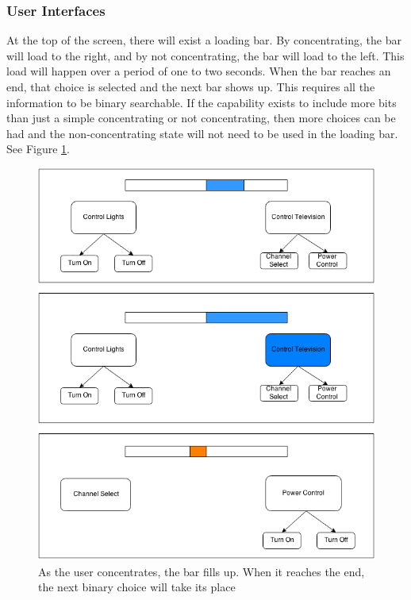 \documentclass{article}
\begin{document}
\subsubsection{User Interfaces}

At the top of the screen, there will exist a loading bar. By concentrating, the bar will load to the right, and by not concentrating, the bar will load to the left. This load will happen over a period of one to two seconds. When the bar reaches an end, that choice is selected and the next bar shows up. This requires all the information to be binary searchable. If the capability exists to include more bits than just a simple concentrating or not concentrating, then more choices can be had and the non-concentrating state will not need to be used in the loading bar. See Figure \ref{fig:mockup}.

\begin{figure}
\includegraphics[width=\textwidth]{mockup_v1.png}
\caption{As the user concentrates, the bar fills up. When it reaches the end, the next binary choice will take its place}
\label{fig:mockup}
\end{figure}
\end{document}

